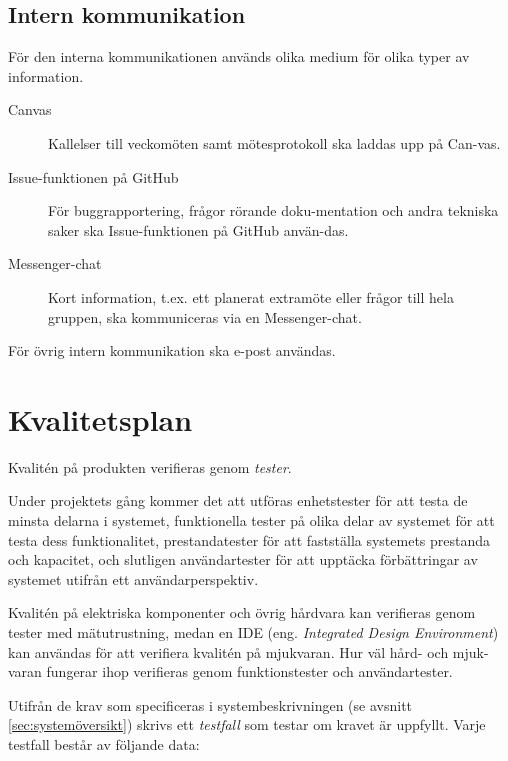 \documentclass[a4paper]{article}
\begin{document}
\subsection*{Intern kommunikation}

För den interna kommunikationen används olika medium för olika typer av information.

\begin{description}
 \item [Canvas] Kallelser till veckomöten samt mötesprotokoll ska laddas upp på Can-vas.
 \item [Issue-funktionen på GitHub] För buggrapportering, frågor rörande doku-mentation och andra tekniska saker ska Issue-funktionen på GitHub använ-das.
 \item [Messenger-chat] Kort information, t.ex. ett planerat extramöte eller frågor till hela gruppen, ska kommuniceras via en Messenger-chat.
\end{description}

För övrig intern kommunikation ska e-post användas.

\section{Kvalitetsplan}
\label{sec:kvalitetsplan}

Kvalitén på produkten verifieras genom \textit{tester}.

Under projektets gång kommer det att utföras enhetstester för att testa de minsta delarna i systemet, funktionella tester på olika delar av systemet för att testa dess funktionalitet, prestandatester för att fastställa systemets prestanda och kapacitet, och slutligen användartester för att upptäcka förbättringar av systemet utifrån ett användarperspektiv.

Kvalitén på elektriska komponenter och övrig hårdvara kan verifieras genom tester med mätutrustning, medan en IDE (eng. \textit{Integrated Design Environment}) kan användas för att verifiera kvalitén på mjukvaran. Hur väl hård- och mjuk-varan fungerar ihop verifieras genom funktionstester och användartester.

Utifrån de krav som specificeras i systembeskrivningen (se avsnitt \ref{sec:systemöversikt}) skrivs ett \textit{testfall} som testar om kravet är uppfyllt. Varje testfall består av följande data:
\end{document}

